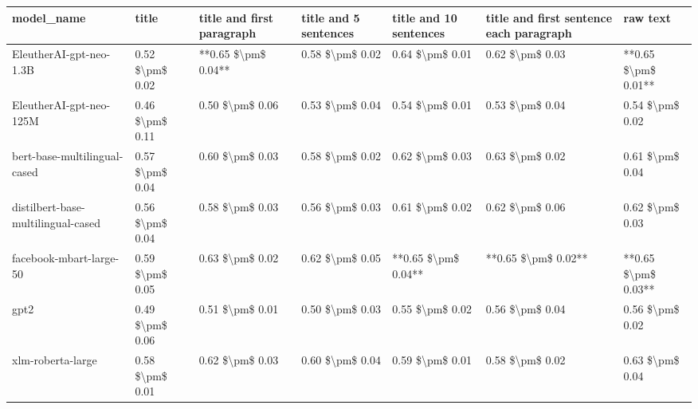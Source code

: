 \begin{tabular}{lllllll}
\toprule
                        model\_name &           title & title and first paragraph & title and 5 sentences & title and 10 sentences & title and first sentence each paragraph &            raw text \\
\midrule
           EleutherAI-gpt-neo-1.3B & 0.52 \$\textbackslash pm\$ 0.02 &       **0.65 \$\textbackslash pm\$ 0.04** &       0.58 \$\textbackslash pm\$ 0.02 &        0.64 \$\textbackslash pm\$ 0.01 &                         0.62 \$\textbackslash pm\$ 0.03 & **0.65 \$\textbackslash pm\$ 0.01** \\
           EleutherAI-gpt-neo-125M & 0.46 \$\textbackslash pm\$ 0.11 &           0.50 \$\textbackslash pm\$ 0.06 &       0.53 \$\textbackslash pm\$ 0.04 &        0.54 \$\textbackslash pm\$ 0.01 &                         0.53 \$\textbackslash pm\$ 0.04 &     0.54 \$\textbackslash pm\$ 0.02 \\
      bert-base-multilingual-cased & 0.57 \$\textbackslash pm\$ 0.04 &           0.60 \$\textbackslash pm\$ 0.03 &       0.58 \$\textbackslash pm\$ 0.02 &        0.62 \$\textbackslash pm\$ 0.03 &                         0.63 \$\textbackslash pm\$ 0.02 &     0.61 \$\textbackslash pm\$ 0.04 \\
distilbert-base-multilingual-cased & 0.56 \$\textbackslash pm\$ 0.04 &           0.58 \$\textbackslash pm\$ 0.03 &       0.56 \$\textbackslash pm\$ 0.03 &        0.61 \$\textbackslash pm\$ 0.02 &                         0.62 \$\textbackslash pm\$ 0.06 &     0.62 \$\textbackslash pm\$ 0.03 \\
           facebook-mbart-large-50 & 0.59 \$\textbackslash pm\$ 0.05 &           0.63 \$\textbackslash pm\$ 0.02 &       0.62 \$\textbackslash pm\$ 0.05 &    **0.65 \$\textbackslash pm\$ 0.04** &                     **0.65 \$\textbackslash pm\$ 0.02** & **0.65 \$\textbackslash pm\$ 0.03** \\
                              gpt2 & 0.49 \$\textbackslash pm\$ 0.06 &           0.51 \$\textbackslash pm\$ 0.01 &       0.50 \$\textbackslash pm\$ 0.03 &        0.55 \$\textbackslash pm\$ 0.02 &                         0.56 \$\textbackslash pm\$ 0.04 &     0.56 \$\textbackslash pm\$ 0.02 \\
                 xlm-roberta-large & 0.58 \$\textbackslash pm\$ 0.01 &           0.62 \$\textbackslash pm\$ 0.03 &       0.60 \$\textbackslash pm\$ 0.04 &        0.59 \$\textbackslash pm\$ 0.01 &                         0.58 \$\textbackslash pm\$ 0.02 &     0.63 \$\textbackslash pm\$ 0.04 \\
\bottomrule
\end{tabular}
